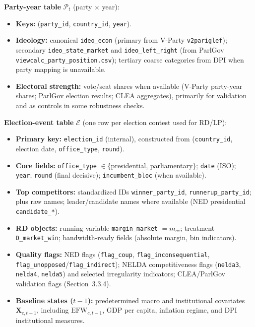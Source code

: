 \documentclass[11pt]{article}
\newcommand{\EFW}{\mathrm{EFW}}
\newcommand{\bX}{\mathbf{X}}
\newcommand{\1}{\mathbf{1}}
\newcommand{\mc}{\mathcal}
\newcommand{\cid}{c}
\newcommand{\eid}{e}
\begin{document}
\textbf{Party-year table} $\mc{P}_t$ (party $\times$ year):
\begin{itemize}[leftmargin=1.2em]
\item \textbf{Keys:} (\texttt{party\_id}, \texttt{country\_id}, \texttt{year}).
\item \textbf{Ideology:} canonical \texttt{ideo\_econ} (primary from V-Party \texttt{v2pariglef}); secondary \texttt{ideo\_state\_market} and \texttt{ideo\_left\_right} (from ParlGov \texttt{viewcalc\_party\_position.csv}); tertiary coarse categories from DPI when party mapping is unavailable.
\item \textbf{Electoral strength:} vote/seat shares when available (V-Party party-year shares; ParlGov election results; CLEA aggregates), primarily for validation and as controls in some robustness checks.
\end{itemize}

\textbf{Election-event table} $\mc{E}$ (one row per election contest used for RD/LP):
\begin{itemize}[leftmargin=1.2em]
\item \textbf{Primary key:} \texttt{election\_id} (internal), constructed from (\texttt{country\_id}, election date, \texttt{office\_type}, \texttt{round}).
\item \textbf{Core fields:} \texttt{office\_type} $\in\{$presidential, parliamentary$\}$; \texttt{date} (ISO); \texttt{year}; \texttt{round} (final decisive); \texttt{incumbent\_bloc} (when available).
\item \textbf{Top competitors:} standardized IDs \texttt{winner\_party\_id}, \texttt{runnerup\_party\_id}; plus raw names; leader/candidate names where available (NED presidential \texttt{candidate\_*}).
\item \textbf{RD objects:} running variable \texttt{margin\_market} $=m_{\cid \eid}$; treatment \texttt{D\_market\_win}; bandwidth-ready fields (absolute margin, bin indicators).
\item \textbf{Quality flags:} NED flags (\texttt{flag\_coup}, \texttt{flag\_inconsequential}, \texttt{flag\_unopposed}/\texttt{flag\_indirect}); NELDA competitiveness flags (\texttt{nelda3}, \texttt{nelda4}, \texttt{nelda5}) and selected irregularity indicators; CLEA/ParlGov validation flags (Section~3.3.4).
\item \textbf{Baseline states ($t-1$):} predetermined macro and institutional covariates $\bX_{\cid,t-1}$, including $\EFW_{\cid,t-1}$, GDP per capita, inflation regime, and DPI institutional measures.
\end{itemize}
\end{document}
